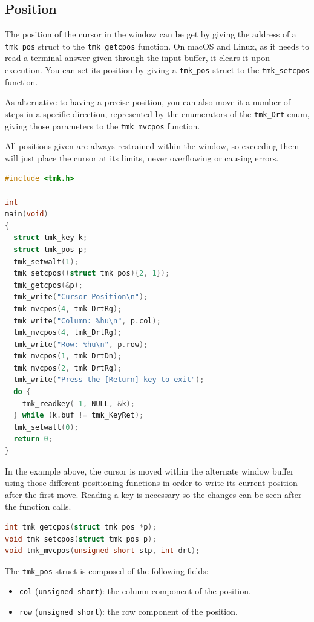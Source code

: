 \documentclass{report}
\begin{document}
\subsection{Position}
The position of the cursor in the window can be get by giving the address of a \texttt{tmk\_pos} struct to the \texttt{tmk\_getcpos} function. On macOS and Linux, as it needs to read a terminal answer given through the input buffer, it clears it upon execution. You can set its position by giving a \texttt{tmk\_pos} struct to the \texttt{tmk\_setcpos} function.

As alternative to having a precise position, you can also move it a number of steps in a specific direction, represented by the enumerators of the \texttt{tmk\_Drt} enum, giving those parameters to the \texttt{tmk\_mvcpos} function.

All positions given are always restrained within the window, so exceeding them will just place the cursor at its limits, never overflowing or causing errors.
\begin{lstlisting}[language=c,caption=an example that interacts with the cursor position in different ways.]
#include <tmk.h>

int
main(void)
{
  struct tmk_key k;
  struct tmk_pos p;
  tmk_setwalt(1);
  tmk_setcpos((struct tmk_pos){2, 1});
  tmk_getcpos(&p);
  tmk_write("Cursor Position\n");
  tmk_mvcpos(4, tmk_DrtRg);
  tmk_write("Column: %hu\n", p.col);
  tmk_mvcpos(4, tmk_DrtRg);
  tmk_write("Row: %hu\n", p.row);
  tmk_mvcpos(1, tmk_DrtDn);
  tmk_mvcpos(2, tmk_DrtRg);
  tmk_write("Press the [Return] key to exit");
  do {
    tmk_readkey(-1, NULL, &k);
  } while (k.buf != tmk_KeyRet);
  tmk_setwalt(0);
  return 0;
}
\end{lstlisting}

In the example above, the cursor is moved within the alternate window buffer using those different positioning functions in order to write its current position after the first move. Reading a key is necessary so the changes can be seen after the function calls.
\begin{lstlisting}[language=c,caption=the declarations of the cursor positioning function.]
int tmk_getcpos(struct tmk_pos *p);
void tmk_setcpos(struct tmk_pos p);
void tmk_mvcpos(unsigned short stp, int drt);
\end{lstlisting}

The \texttt{tmk\_pos} struct is composed of the following fields:
\begin{itemize}
  \item \texttt{col} (\texttt{unsigned short}): the column component of the position.
  \item \texttt{row} (\texttt{unsigned short}): the row component of the position.
\end{itemize}
\end{document}
